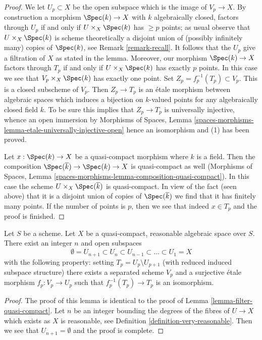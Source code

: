 \begin{proof}
\medskip\noindent
We let $U_p \subset X$ be the open subspace which is the
image of $V_p \to X$. By construction a morphism $\Spec(k) \to X$ with
$k$ algebraically closed, factors through $U_p$ if and only if
$U \times_X \Spec(k)$ has $\geq p$ points; as usual observe that
$U \times_X \Spec(k)$ is scheme theoretically a disjoint union of
(possibly infinitely many) copies of $\Spec(k)$, see
Remark \ref{remark-recall}. It follows that
the $U_p$ give a filtration of $X$ as stated in the lemma.
Moreover, our morphism $\Spec(k) \to X$ factors through $T_p$
if and only if $U \times_X \Spec(k)$ has exactly $p$ points.
In this case we see that $V_p \times_X \Spec(k)$ has exactly one point.
Set $Z_p = f_p^{-1}(T_p) \subset V_p$. This is a closed subscheme of $V_p$.
Then $Z_p \to T_p$ is an \'etale morphism between
algebraic spaces which induces a bijection on $k$-valued
points for any algebraically closed field $k$. To be sure this
implies that $Z_p \to T_p$ is universally injective, whence an
open immersion by
Morphisms of Spaces, Lemma
\ref{spaces-morphisms-lemma-etale-universally-injective-open}
hence an isomorphism and (1) has been proved.

\medskip\noindent
Let $x : \Spec(k) \to X$ be a quasi-compact morphism where $k$ is a field.
Then the composition $\Spec(\overline{k}) \to \Spec(k) \to X$ is quasi-compact
as well (Morphisms of Spaces, Lemma
\ref{spaces-morphisms-lemma-composition-quasi-compact}).
In this case the scheme $U \times_X \Spec(\overline{k})$ is
quasi-compact. In view of the fact (seen above) that it is a disjoint union
of copies of $\Spec(\overline{k})$ we find that it has finitely many points.
If the number of points is $p$, then we see that indeed $x \in T_p$ and
the proof is finished.
\end{proof}

\begin{lemma}
\label{lemma-filter-reasonable}
Let $S$ be a scheme. Let $X$ be a quasi-compact, reasonable algebraic space
over $S$. There exist an integer $n$ and open subspaces
$$
\emptyset = U_{n + 1} \subset
U_n \subset U_{n - 1} \subset \ldots \subset U_1 = X
$$
with the following property: setting $T_p = U_p \setminus U_{p + 1}$
(with reduced induced subspace structure) there exists a separated scheme
$V_p$ and a surjective \'etale morphism $f_p : V_p \to U_p$ such that
$f_p^{-1}(T_p) \to T_p$ is an isomorphism.
\end{lemma}

\begin{proof}
The proof of this lemma is identical to the proof of
Lemma \ref{lemma-filter-quasi-compact}.
Let $n$ be an integer bounding the degrees of
the fibres of $U \to X$ which exists as $X$ is reasonable, see
Definition \ref{definition-very-reasonable}.
Then we see that $U_{n + 1} = \emptyset$ and the proof is complete.
\end{proof}

